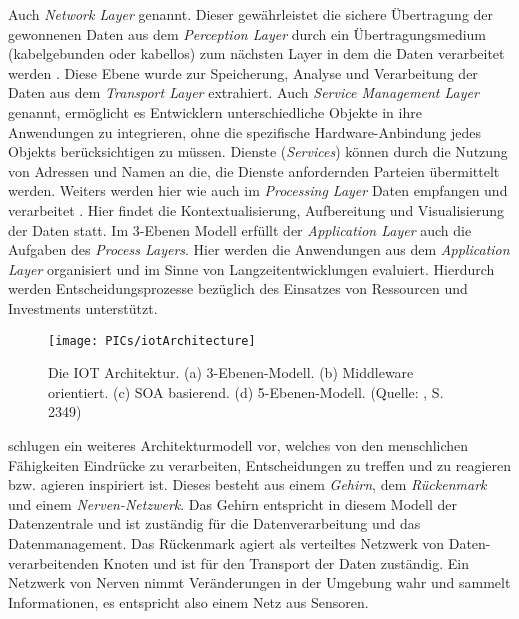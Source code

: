 \documentclass[BMR,Bachelor,ngerman]{twbook}%
\begin{document}
 Auch \emph{Network Layer} genannt. Dieser gewährleistet die sichere Übertragung der gewonnenen Daten aus dem \emph{Perception Layer} durch ein Übertragungsmedium (kabelgebunden oder kabellos) zum nächsten Layer in dem die Daten verarbeitet werden \cite{khan2012future}.
%
 Diese Ebene wurde zur Speicherung, Analyse und Verarbeitung der Daten aus dem \emph{Transport Layer} extrahiert.
%
 Auch \emph{Service Management Layer} genannt, ermöglicht es Entwicklern  unterschiedliche Objekte in ihre Anwendungen zu integrieren, ohne die spezifische Hardware-Anbindung jedes Objekts berücksichtigen zu müssen. Dienste (\emph{Services}) können durch die Nutzung von Adressen und Namen an die, die Dienste anfordernden Parteien übermittelt werden. Weiters werden hier wie auch im \emph{Processing Layer} Daten empfangen und verarbeitet \cite{alfuqaha2015survey}.
%
 Hier findet die Kontextualisierung, Aufbereitung und Visualisierung der Daten statt. Im 3-Ebenen Modell erfüllt der \emph{Application Layer} auch die Aufgaben des \emph{Process Layers}.
%
 Hier werden die Anwendungen aus dem \emph{Application Layer} organisiert und im Sinne von Langzeitentwicklungen evaluiert. Hierdurch werden Entscheidungsprozesse bezüglich des Einsatzes von Ressourcen und Investments unterstützt.
\begin{figure}[!htbp]
\centering
\texttt{[image: PICs/iotArchitecture]}
\caption{Die \ac{IOT} Architektur. (a) 3-Ebenen-Modell. (b) Middleware orientiert. (c) SOA basierend. (d) 5-Ebenen-Modell. (Quelle: \protect\cite{alfuqaha2015survey}, S. 2349)}\label{fig:layer}
\end{figure}
%
\par{} schlugen ein weiteres Architekturmodell vor, welches von den menschlichen Fähigkeiten Eindrücke zu verarbeiten, Entscheidungen zu treffen und zu reagieren bzw. agieren inspiriert ist. Dieses besteht aus einem \emph{Gehirn}, dem \emph{Rückenmark} und einem \emph{Nerven-Netzwerk}. Das Gehirn entspricht in diesem Modell der Datenzentrale und ist zuständig für die Datenverarbeitung und das Datenmanagement. Das Rückenmark agiert als verteiltes Netzwerk von Daten-verarbeitenden Knoten und ist für den Transport der Daten zuständig. Ein Netzwerk von Nerven nimmt Veränderungen in der Umgebung wahr und sammelt Informationen, es entspricht also einem Netz aus Sensoren.
\end{document}
